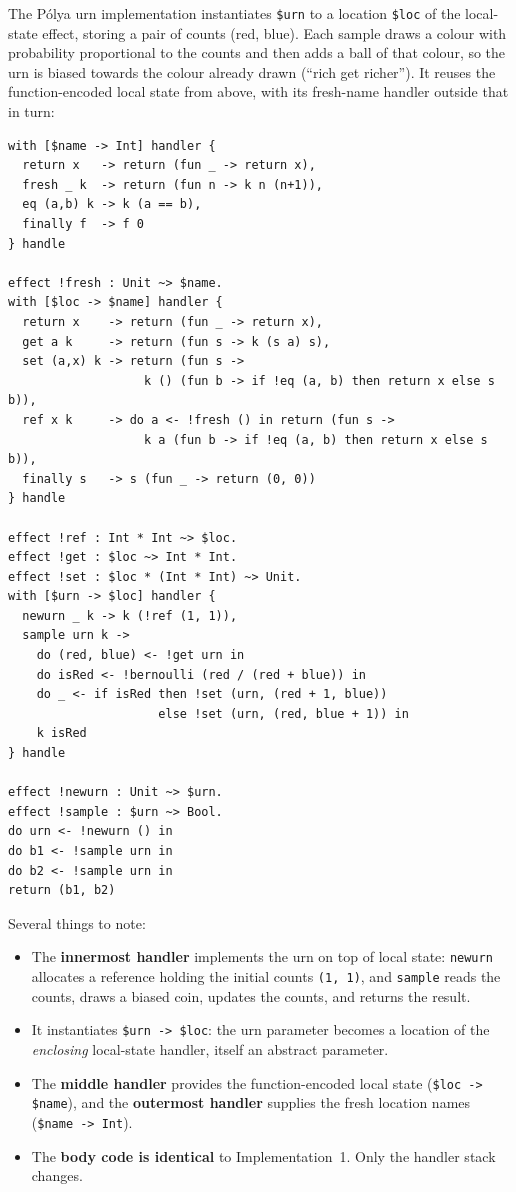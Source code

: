 \documentclass[11pt,a4paper]{article}
\begin{document}
The P\'{o}lya urn implementation instantiates \texttt{\$urn} to a location
\texttt{\$loc} of the local-state effect, storing a pair of counts (red,
blue).  Each sample draws a colour with probability proportional to the counts
and then adds a ball of that colour, so the urn is biased towards the colour
already drawn (``rich get richer'').  It reuses the function-encoded local
state from above, with its fresh-name handler outside that in turn:

\begin{lstlisting}
with [$name -> Int] handler {
  return x   -> return (fun _ -> return x),
  fresh _ k  -> return (fun n -> k n (n+1)),
  eq (a,b) k -> k (a == b),
  finally f  -> f 0
} handle

effect !fresh : Unit ~> $name.
with [$loc -> $name] handler {
  return x    -> return (fun _ -> return x),
  get a k     -> return (fun s -> k (s a) s),
  set (a,x) k -> return (fun s ->
                   k () (fun b -> if !eq (a, b) then return x else s b)),
  ref x k     -> do a <- !fresh () in return (fun s ->
                   k a (fun b -> if !eq (a, b) then return x else s b)),
  finally s   -> s (fun _ -> return (0, 0))
} handle

effect !ref : Int * Int ~> $loc.
effect !get : $loc ~> Int * Int.
effect !set : $loc * (Int * Int) ~> Unit.
with [$urn -> $loc] handler {
  newurn _ k -> k (!ref (1, 1)),
  sample urn k ->
    do (red, blue) <- !get urn in
    do isRed <- !bernoulli (red / (red + blue)) in
    do _ <- if isRed then !set (urn, (red + 1, blue))
                     else !set (urn, (red, blue + 1)) in
    k isRed
} handle

effect !newurn : Unit ~> $urn.
effect !sample : $urn ~> Bool.
do urn <- !newurn () in
do b1 <- !sample urn in
do b2 <- !sample urn in
return (b1, b2)
\end{lstlisting}

Several things to note:

\begin{itemize}
  \item The \textbf{innermost handler} implements the urn on top of local
        state: \texttt{newurn} allocates a reference holding the initial counts
        \texttt{(1, 1)}, and \texttt{sample} reads the counts, draws a biased
        coin, updates the counts, and returns the result.
  \item It instantiates \texttt{\$urn -> \$loc}: the urn parameter becomes a
        location of the \emph{enclosing} local-state handler, itself an
        abstract parameter.
  \item The \textbf{middle handler} provides the function-encoded local state
        (\texttt{\$loc -> \$name}), and the \textbf{outermost handler} supplies
        the fresh location names (\texttt{\$name -> Int}).
  \item The \textbf{body code is identical} to Implementation~1.  Only the
        handler stack changes.
\end{itemize}
\end{document}
